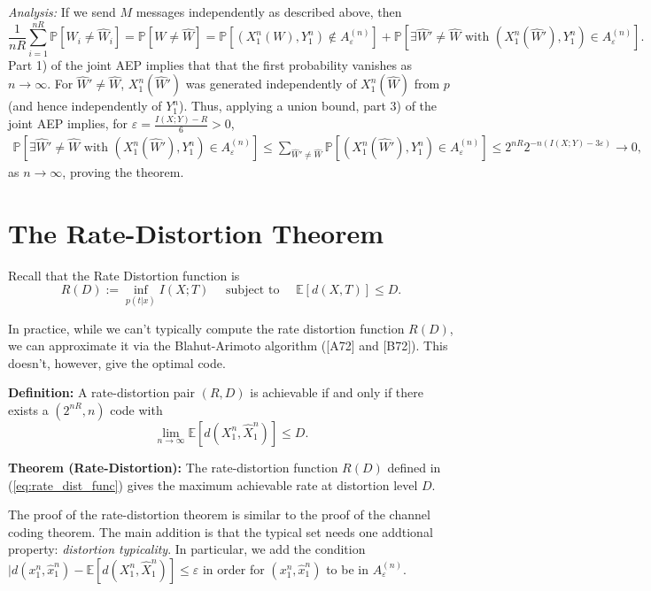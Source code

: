\documentclass[twoside]{article}
\renewcommand{\cite}[1]{[#1]}
\newcommand\E{\mathbb{E}}       %
\newcommand\pr{\mathbb{P}}      %
\newcommand\e{\varepsilon}
\renewcommand\hat{\widehat}
\begin{document}
\emph{Analysis:}
If we send $M$ messages independently as described above, then
\[\frac{1}{nR} \sum_{i = 1}^{nR} \pr\left[ W_i \neq \hat W_i \right]
    = \pr\left[ W \neq \hat W \right]
    = \pr\left[ (X_1^n(W),Y_1^n) \notin A_\e^{(n)} \right]
    + \pr\left[ \exists \hat W' \neq \hat W
                \mbox{ with } (X_1^n(\hat W'), Y_1^n) \in A_\e^{(n)} \right].
\]
Part 1) of the joint AEP implies that that the first probability vanishes as
$n \to \infty$. For $\hat W' \neq \hat W$, $X_1^n(\hat W')$
was generated independently of $X_1^n(\hat W)$ from $p$ (and hence
independently of $Y_1^n$). Thus, applying a union bound, part 3) of the joint
AEP implies, for $\e = \frac{I(X;Y) - R}{6} > 0$,
\begin{align*}
\pr\left[ \exists \hat W' \neq \hat W
                \mbox{ with } (X_1^n(\hat W'), Y_1^n) \in A_\e^{(n)} \right]
    \leq \sum_{\hat W' \neq \hat W} \pr\left[ (X_1^n(\hat W'),Y_1^n) \in A_\e^{(n)} \right]
    \leq 2^{nR} 2^{-n(I(X;Y) - 3\e)}
    \to 0,
\end{align*}
as $n \to \infty$, proving the theorem.

\section{The Rate-Distortion Theorem}

Recall that the Rate Distortion function is
\begin{equation}
R(D) := \inf_{p(t|x)} I(X;T)
            \quad \mbox{ subject to } \quad \E\left[ d(X,T) \right] \leq D.
\label{eq:rate_dist_func}
\end{equation}

In practice, while we can't typically compute the rate distortion function
$R(D)$, we can approximate it via the Blahut-Arimoto algorithm (\cite{A72} and
\cite{B72}). This doesn't, however, give the optimal code.

{\bf Definition:} A rate-distortion pair $(R,D)$ is achievable if and only if
there exists a $(2^{nR},n)$ code with
\[\lim_{n \to \infty} \E\left[ d(X_1^n,\hat X_1^n) \right] \leq D.\]

{\bf Theorem (Rate-Distortion):} The rate-distortion function $R(D)$ defined in
(\ref{eq:rate_dist_func}) gives the maximum achievable rate at distortion level
$D$.

The proof of the rate-distortion theorem is similar to the proof of the channel
coding theorem. The main addition is that the typical set needs one addtional
property: \emph{distortion typicality}. In particular, we add the condition
$|d(x_1^n, \hat x_1^n) - \E\left[ d(X_1^n, \hat X_1^n) \right] \leq \e$ in
order for $(x_1^n, \hat x_1^n)$ to be in $A_\e^{(n)}$.
\end{document}
